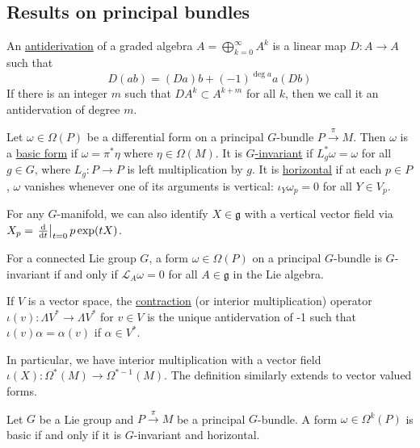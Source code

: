 \subsection{Results on principal bundles}
\begin{defn} %
	An \underline{antiderivation} of a graded algebra $A=\bigoplus_{k=0}^\infty
	A^k$ is a linear map $D : A\to A$ such that 
	 \[
	D(ab) = (Da)b + (-1)^{\deg a} a(Db)
	\] 
	If there is an integer $m$ such that  $D A^k \subset A^{k+m}$ for all $k$,
	then we call it an antidervation of degree  $m$.
\end{defn}
\begin{defn} 
	Let  $\omega\in \Omega(P)$ be a differential form on a principal $G$-bundle
	$P\xrightarrow{\pi} M$. 
	Then $\omega$ is a \underline{basic form} if  $\omega = \pi^*\eta$
	where  $\eta\in\Omega(M)$. 
	It is \underline{$G$-invariant} if $L^*_g \omega =\omega$ for all  $g\in G$,
	where $L_g : P\to P$ is left multiplication by  $g$.
	It is \underline{horizontal} if at each $p\in P$,
    $\omega$ vanishes whenever one of its arguments is vertical:
	$\iota_Y\omega_p = 0$ for all  $Y\in V_p$.
\end{defn}
\noindent
For any $G$-manifold, we can also identify $X\in \mathfrak{g}$ with 
a vertical vector field via $X_p = \odv{}{t}_{t=0} p \exp (t X)$. 
\begin{thm} %
	For a connected Lie group $G$, a form $\omega\in \Omega(P)$ on a principal
	 $G$-bundle is  $G$-invariant if and only if  $\mathcal{L}_A\omega=0$ for
	 all $A\in\mathfrak{g}$ in the Lie algebra.
\end{thm}
\begin{defn} \label{def:contraction} %
	If $V$ is a vector space, the \underline{contraction} (or interior
	multiplication) operator $\iota(v) :
	\Lambda V^* \to \Lambda V^*$ for $v\in V$ is the unique antidervation of -1 
	such that $\iota(v)\alpha = \alpha(v)$ if  $\alpha\in V^*$.
\end{defn}
\noindent
In particular, we have interior multiplication with a vector
field $\iota(X) : \Omega^*(M) \to \Omega^{*-1}(M)$.
The definition similarly extends to vector valued forms.

\begin{thm} %
	Let $G$ be a Lie group and  $P\xrightarrow{\pi} M$ be a principal
	$G$-bundle. A form  $\omega\in\Omega^k(P)$ is basic if and only if it is
	$G$-invariant and horizontal.
\end{thm}


